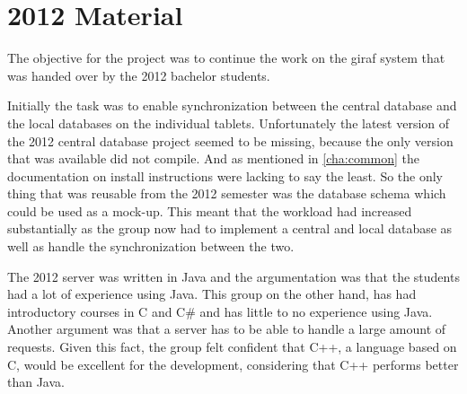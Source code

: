 \section{2012 Material}
The objective for the project was to continue the work on the \ac{giraf} system that was handed over by the 2012 bachelor students. 

Initially the task was to enable synchronization between the central database and the local databases on the individual tablets. Unfortunately the latest version of the 2012 central database project seemed to be missing, because the only version that was available did not compile. And as mentioned in \autoref{cha:common} the documentation on install instructions were lacking to say the least. So the only thing that was reusable from the 2012 semester was the database schema which could be used as a mock-up. This meant that the workload had increased substantially as the group now had to implement a central and local database as well as handle the synchronization between the two.

The 2012 server was written in Java and the argumentation was that the students had a lot of experience using Java. This group on the other hand, has had introductory courses in C and C\# and has little to no experience using Java. Another argument was that a server has to be able to handle a large amount of requests. Given this fact, the group felt confident that C++, a language based on C, would be excellent for the development, considering that C++ performs better than Java.\cite{hundt11}